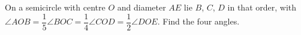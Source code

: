 On a semicircle with centre $O$ and diameter $AE$ lie $B$, $C$, $D$ in that order, with $\angle AOB=\dfrac15\angle BOC=\dfrac14\angle COD=\dfrac12\angle DOE$. Find the four angles.
